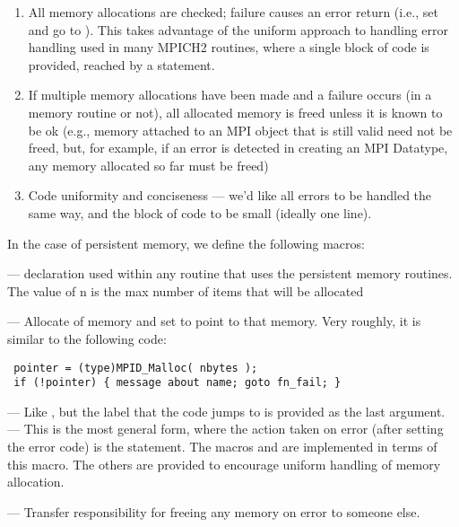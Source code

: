 \documentclass{article}
\begin{document}
\begin{enumerate}
\item All memory allocations are checked; failure causes an error return (i.e.,
set  and go to ).  This takes advantage of the
uniform approach to handling error handling used in many MPICH2 routines,
where a single block of code is provided, reached by a 
statement. 
\item If multiple memory allocations have been made and a failure occurs (in a
memory routine or not), all allocated memory is freed unless it is known
to be ok (e.g., memory attached to an MPI object that is still valid need not
be freed, but, for example, if an error is detected in creating an MPI
Datatype, any memory allocated so far must be freed) 
\item Code uniformity and conciseness --- we'd like all errors to be handled
  the same way, and the block of code to be small (ideally one line). 
\end{enumerate}

In the case of persistent memory, we define the following macros:

 --- declaration used within any routine that uses
the persistent memory routines.  The value of n is the max number of 
items that will be allocated

 ---
Allocate  of memory and set  to point to that
memory.  Very roughly, it is similar to the following code:
\begin{verbatim}
 pointer = (type)MPID_Malloc( nbytes ); 
 if (!pointer) { message about name; goto fn_fail; }
\end{verbatim}

 --- Like , but the label that the code jumps to
  is provided as the last argument.
 --- This is the most general form, where the
  action taken on error (after setting the error code) is the
  statement.  The macros  and
   are implemented in terms of this
  macro.  The others are provided to encourage uniform handling of
  memory allocation.

 --- Transfer responsibility for freeing any memory
on error to someone else.
\end{document}
